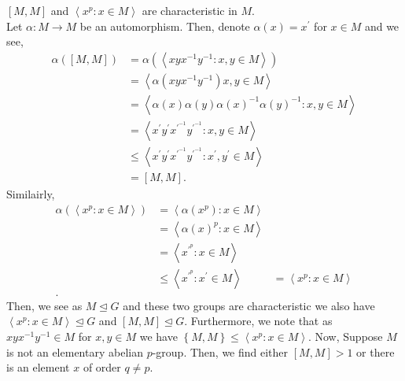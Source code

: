 \documentclass[a4paper]{article}
\begin{document}
\newpage
\begin{solution}[3]

\end{solution}
\newpage
\begin{solution}[4]
	\begin{lemma}
		\(\left[ M, M \right] \)  and \(\left<x^{p} : x \in M \right> \)  are characteristic in \(M\).\\
		Let \(\alpha: M \to M\) be an automorphism. Then, denote \(\alpha\left( x \right)  = x^{\prime}\)  for \(x \in M\) and we see,
		\begin{align*}
			\alpha\left( \left[ M, M \right]  \right) &= \alpha\left( \left<xyx^{-1}y^{-1} : x, y \in M \right> \right)  \\
								  &= \left<\alpha\left( xyx^{-1}y^{-1} \right) x, y \in M \right>  \\
								  &= \left<\alpha\left( x \right) \alpha\left( y \right) \alpha\left( x \right) ^{-1} \alpha\left( y \right)^{-1} : x, y \in M  \right>  \\
								  &= \left<x^{\prime} y^{\prime} x^{\prime}^{-1} y^{\prime}^{-1} : x, y \in M \right>  \\
								  &\le \left<x^{\prime}y^{\prime}x^{\prime}^{-1}y^{\prime}^{-1} : x^{\prime}, y^{\prime} \in  M \right>  \\
								  &=  \left[ M, M \right]
		.\end{align*}
		Similairly,
		\begin{align*}
			\alpha \left( \left<x^{p} : x\in M \right>  \right) &= \left<\alpha\left( x^{p} \right): x \in M  \right>  \\
									    &= \left<\alpha\left( x \right) ^{p} : x \in M \right>  \\
									    &= \left<x^{\prime}^{p} : x \in M \right>  \\
									    &\le \left<x^{\prime}^{p} : x^{\prime} \in M \right>
									    &= \left<x^{p} : x \in M \right>  \\
		.\end{align*}
Then, we see as \(M \trianglelefteq G\) and these two groups are characteristic we also have \(\left<x^{p}: x\in M \right> \trianglelefteq G \) and \(\left[ M, M \right] \trianglelefteq G\). Furthermore, we note that as \(xyx^{-1}y^{-1} \in M\)  for \(x, y \in M\) we have \(\left\{ M, M \right\}  \le \left<x^{p}: x\in M \right> \). Now,
Suppose \(M\) is not an elementary abelian \(p\)-group. Then, we find either \(\left[ M, M \right] > 1\)  or there is an element \(x\) of order \(q \neq p\).
	\end{lemma}
\end{solution}
\newpage
\begin{solution}[5]


\end{solution}
\end{document}
